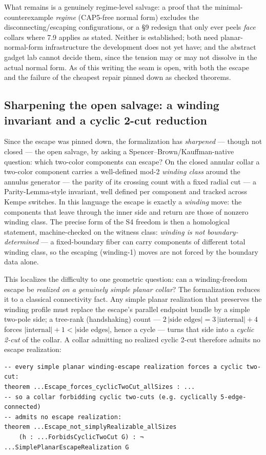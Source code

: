 \documentclass[11pt]{article}
\theoremstyle{definition}
\begin{document}
What remains is a genuinely regime-level salvage: a proof that the
minimal-counterexample \emph{regime} (CAP5-free normal form) excludes the
disconnecting/escaping configurations, or a \S9 redesign that only ever peels
\emph{face} collars where 7.9 applies as stated. Neither is established; both need
planar-normal-form infrastructure the development does not yet have; and the
abstract gadget lab cannot decide them, since the tension may or may not dissolve
in the actual normal form. As of this writing the seam is open, with both the
escape and the failure of the cheapest repair pinned down as checked theorems.

\subsection{Sharpening the open salvage: a winding invariant and a cyclic 2-cut reduction}

Since the escape was pinned down, the formalization has \emph{sharpened} --- though
not closed --- the open salvage, by asking a Spencer--Brown/Kauffman-native
question: which two-color components can escape? On the closed annular collar a
two-color component carries a well-defined mod-2 \emph{winding class} around the
annulus generator --- the parity of its crossing count with a fixed radial cut ---
a Parity-Lemma-style invariant, well defined per component and tracked across Kempe
switches. In this language the escape is exactly a \emph{winding} move: the
components that leave through the inner side and return are those of nonzero winding
class. The precise form of the S4 freedom is then a homological statement,
machine-checked on the witness class: \emph{winding is not boundary-determined} --- a
fixed-boundary fiber can carry components of different total winding class, so the
escaping (winding-1) moves are not forced by the boundary data alone.

This localizes the difficulty to one geometric question: can a winding-freedom
escape be \emph{realized on a genuinely simple planar collar}? The formalization
reduces it to a classical connectivity fact. Any simple planar realization that
preserves the winding profile must replace the escape's parallel endpoint bundle by
a simple two-pole side; a tree-rank (handshaking) count ---
$2\,|\text{side edges}| = 3\,|\text{internal}| + 4$ forces
$|\text{internal}|+1 < |\text{side edges}|$, hence a cycle --- turns that side into
a \emph{cyclic 2-cut} of the collar. A collar admitting no realized cyclic 2-cut
therefore admits no escape realization:
\begin{lstlisting}[language={}]
-- every simple planar winding-escape realization forces a cyclic two-cut:
theorem ...Escape_forces_cyclicTwoCut_allSizes : ...
-- so a collar forbidding cyclic two-cuts (e.g. cyclically 5-edge-connected)
-- admits no escape realization:
theorem ...Escape_not_simplyRealizable_allSizes
    (h : ...ForbidsCyclicTwoCut G) : ¬ ...SimplePlanarEscapeRealization G
\end{lstlisting}
\end{document}
